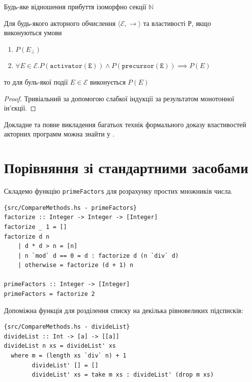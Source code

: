 \documentclass[12pt]{article}
\begin{document}
\begin{corollary}
Будь-яке відношення прибуття ізоморфно секції $\mathbb{N}$
\end{corollary}

\begin{theorem}
Для будь-якого акторного обчислення $\langle\mathcal{E}, \longrightarrow\rangle$ та властивості Р, якщо виконуються умови
\begin{enumerate}
    \item $P(E_{\bot})$
    \item $\forall E \in \mathcal{E}. P(\mathtt{activator(E)}) \land P(\mathtt{precursor(E)}) \implies P(E)$
\end{enumerate}
то для буль-якої події $E \in \mathcal{E}$ виконується $P(E)$
\end{theorem}

\begin{proof}
Тривіальний за допомогою слабкої індукції за результатом монотонної ін'єкції.
\end{proof}

Докладне та повне викладення багатьох технік формального доказу властивостей акторних программ можна знайти у\cite{yonezawa} .

\section{Порівняння зі стандартними засобами}
Складемо функцію \lstinline{primeFactors} для розрахунку простих множників числа. 

\begin{lstlisting}{src/CompareMethods.hs - primeFactors}
factorize :: Integer -> Integer -> [Integer]
factorize _ 1 = [] 
factorize d n 
    | d * d > n = [n]
    | n `mod` d == 0 = d : factorize d (n `div` d)
    | otherwise = factorize (d + 1) n

primeFactors :: Integer -> [Integer]
primeFactors = factorize 2
\end{lstlisting}

Допоміжна функція для розділення списку на декілька рівновеликих підсписків:\\

\begin{lstlisting}{src/CompareMethods.hs - divideList}
divideList :: Int -> [a] -> [[a]]
divideList n xs = divideList' xs
  where m = (length xs `div` n) + 1
        divideList' [] = []
        divideList' xs = take m xs : divideList' (drop m xs)
\end{lstlisting}
\end{document}
